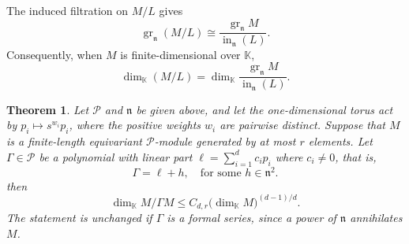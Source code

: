 \documentclass[11pt,reqno]{amsart}
\newcommand\K{\ensuremath{\mathbb{K}}}
\newtheorem{theorem}{Theorem}[section]
\theoremstyle{definition}
\theoremstyle{plain}
\numberwithin{equation}{section}
\begin{document}
The induced filtration on $M/L$ gives
\begin{equation*}
    \operatorname{gr}_{\mathfrak{n}}(M/L)
    \cong
    \frac{
        \operatorname{gr}_{\mathfrak{n}}M
    }{
        \operatorname{in}_{\mathfrak{n}}(L)
    }.
\end{equation*}
Consequently, when $M$ is finite-dimensional over $\K$,
\begin{equation*}
    \dim_{\K}(M/L)
    =
    \dim_{\K}
    \frac{
        \operatorname{gr}_{\mathfrak{n}}M
    }{
        \operatorname{in}_{\mathfrak{n}}(L)
    }.
\end{equation*}


\begin{theorem}\label{thm:green-boundary}
Let $\mathscr{P}$ and $\mathfrak{n}$ be given above,
and let the one-dimensional torus act by
$p_i\mapsto s^{w_i}p_i$, where the positive weights $w_i$ are pairwise
distinct.  Suppose that $M$ is a finite-length equivariant
$\mathscr P$-module generated by at most $r$ elements.  Let $\Gamma\in \mathscr{P}$ be a polynomial with linear part $\ell=\sum_{i=1}^dc_ip_i$ where $c_i\neq 0$, that is,
\[
 \Gamma=\ell+h,\quad \text{for some }h\in \mathfrak{n}^2.
\]
then
\begin{equation}\label{eq:weighted-green-boundary}
 \dim_\K M/\Gamma M
 \le C_{d,r}\bigl(\dim_\K M\bigr)^{(d-1)/d}.
\end{equation}
The statement is unchanged if $\Gamma$ is a formal series, since a power
of $\mathfrak{n}$ annihilates $M$.
\end{theorem}
\end{document}
